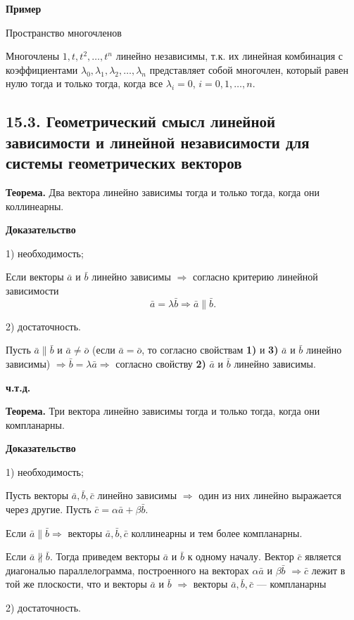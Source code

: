 \documentclass[12pt,a4paper]{article}
\newcommand{\va}{\bar a}
\newcommand{\vb}{\bar b}
\newcommand{\vc}{\bar c}
\newcommand{\vo}{\bar o}
\begin{document}
\textbf{Пример}

Пространство многочленов

Многочлены $1, t, t^2, \ldots, t^n$ линейно независимы, т.к. их
линейная комбинация с коэффициентами $\lambda_0, \lambda_1,
\lambda_2, \ldots, \lambda_n$ представляет собой многочлен, который
равен нулю тогда и только тогда, когда все $\lambda_i = 0$, $i = 0,
1, \ldots, n$.

\subsection*{\textbf{15.3. Геометрический смысл линейной зависимости
и линейной независимости для системы геометрических векторов}}

\textbf{Теорема.} Два вектора линейно зависимы тогда и только тогда,
когда они коллинеарны.

\textbf{Доказательство}

1) необходимость;

Если векторы $\va$ и $\vb$ линейно зависимы $\Rightarrow$ согласно
критерию линейной зависимости
$$
\va = \lambda \vb \Rightarrow \va \parallel \vb.
$$

2) достаточность.

Пусть $\va \parallel \vb$ и $\va \ne \vo$ (если $\va = \vo$, то
согласно свойствам \textbf{1)} и \textbf{3)} $\va$ и $\vb$ линейно зависимы)
$\Rightarrow \vb = \lambda \va \Rightarrow$ согласно свойству
\textbf{2)} $\va$ и $\vb$ линейно зависимы.

\textbf{ч.т.д.}

\textbf{Теорема.} Три вектора линейно зависимы тогда и только тогда,
когда они компланарны.

\textbf{Доказательство}

1) необходимость;

Пусть векторы $\va, \vb, \vc$ линейно зависимы $\Rightarrow$ один из
них линейно выражается через другие. Пусть $\vc = \alpha \va + \beta \vb$.

Если $\va \parallel \vb \Rightarrow$ векторы $\va, \vb, \vc$
коллинеарны и тем более компланарны.

Если $\va \nparallel \vb$. Тогда приведем векторы $\va$ и $\vb$ к
одному началу. Вектор $\vc$ является диагональю параллелограмма,
построенного на векторах $\alpha \va$ и $\beta \vb$ $\Rightarrow \vc$
лежит в той же плоскости, что и векторы $\va$ и $\vb$ $\Rightarrow$
векторы $\va, \vb, \vc$ --- компланарны

2) достаточность.
\end{document}
